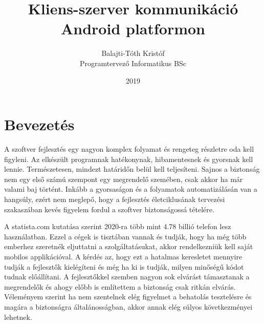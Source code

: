\documentclass{thesis-ekf}
\theoremstyle{definition}
\theoremstyle{remark}
\begin{document}
\title{Kliens-szerver kommunikáció\\Android platformon}
\author{Balajti-Tóth Kristóf\\Programtervező Informatikus BSc}
\date{2019}
\maketitle
\tableofcontents
\listoffigures
\renewcommand\listoflistingscaption{Forráskódok jegyzéke}
\listoflistings

\chapter*{Bevezetés}
A szoftver fejlesztés egy nagyon komplex folyamat és rengeteg részletre oda kell figyleni.
Az elkészült programnak hatékonynak, hibamentesnek és gyorsnak kell lennie. Természetesen, mindezt határidőn belül kell teljesíteni.
Sajnos a biztonság nem egy első számú szempont egy megrendelő szemében, csak akkor ha már valami baj történt.
Inkább a gyorsaságon és a folyamatok automatizálásán van a hangsúly, ezért nem  meglepő, hogy a fejlesztés életciklusának tervezési szakaszában kevés figyelem fordul a szoftver biztonságossá tételére.

A statista.com \cite{statista} kutatása szerint 2020-ra több mint 4.78 billió telefon lesz használatban.
Ezzel a cégek is tisztában vannak és tudják, hogy ha még több emberhez szeretnék eljuttatni a szolgáltatásukat, akkor rendelkezniük kell saját mobilos applikációval.
A kérdés az, hogy ezt a hatalmas keresletet mennyire tudják a fejlesztők kielégíteni és még ha ki is tudják, milyen minőségű kódot tudnak előállítani.
A fejlesztőkkel szemben nagyon sok elvárást támasztanak a megrendelők és ahogy előbb is említettem a biztonság csak ritkán elvárás.
Véleményem szerint ha nem szentelnek elég figyelmet a behatolás tesztelésre és magára a biztonságra általánosságban, akkor annak elég súlyos következményei lehetnek.
\end{document}
